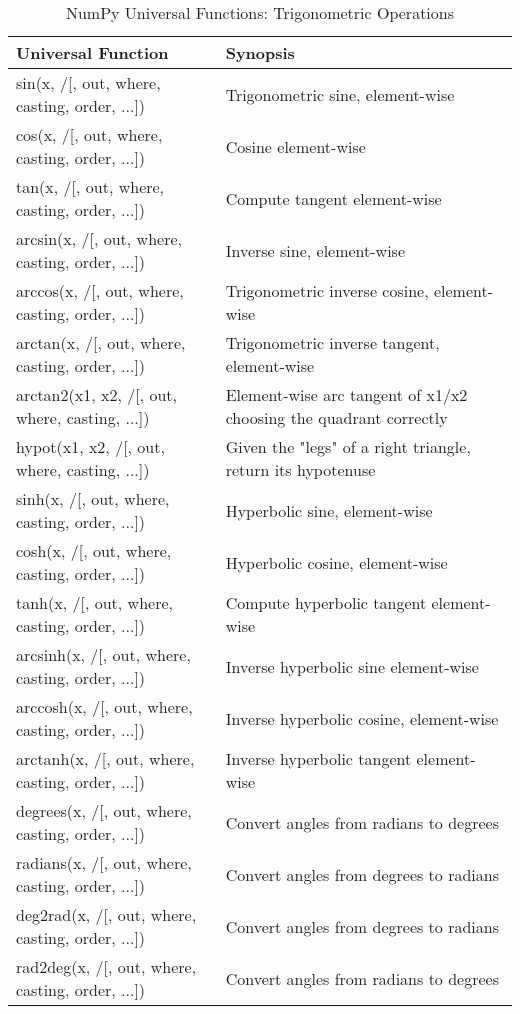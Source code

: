 \documentclass[a4paper,11pt]{book}
\numberwithin{figure}{chapter}
\numberwithin{table}{chapter}
\begin{document}
\begin{appendices}
\begin{table}
\caption{NumPy Universal Functions: Trigonometric Operations}
\centering
\begin{tabular}{lp{8.5cm}}
\toprule \toprule 
Universal Function & Synopsis \\
\midrule
sin(x, /[, out, where, casting, order, ...])
& Trigonometric sine, element-wise\\
cos(x, /[, out, where, casting, order, ...])
& Cosine element-wise\\
tan(x, /[, out, where, casting, order, ...])
& Compute tangent element-wise\\
arcsin(x, /[, out, where, casting, order, ...])
& Inverse sine, element-wise\\
arccos(x, /[, out, where, casting, order, ...])
& Trigonometric inverse cosine, element-wise\\
arctan(x, /[, out, where, casting, order, ...])
& Trigonometric inverse tangent, element-wise\\
arctan2(x1, x2, /[, out, where, casting, ...])
& Element-wise arc tangent of x1/x2 choosing the quadrant correctly\\
hypot(x1, x2, /[, out, where, casting, ...])
& Given the "legs" of a right triangle, return its hypotenuse\\
sinh(x, /[, out, where, casting, order, ...])
& Hyperbolic sine, element-wise\\
cosh(x, /[, out, where, casting, order, ...])
& Hyperbolic cosine, element-wise\\
tanh(x, /[, out, where, casting, order, ...])
& Compute hyperbolic tangent element-wise\\
arcsinh(x, /[, out, where, casting, order, ...])
& Inverse hyperbolic sine element-wise\\
arccosh(x, /[, out, where, casting, order, ...])
& Inverse hyperbolic cosine, element-wise\\
arctanh(x, /[, out, where, casting, order, ...])
& Inverse hyperbolic tangent element-wise\\
degrees(x, /[, out, where, casting, order, ...])
& Convert angles from radians to degrees\\
radians(x, /[, out, where, casting, order, ...])
& Convert angles from degrees to radians\\
deg2rad(x, /[, out, where, casting, order, ...])
& Convert angles from degrees to radians\\
rad2deg(x, /[, out, where, casting, order, ...])
& Convert angles from radians to degrees\\
\bottomrule
\end{tabular}
\end{table}
\clearpage


\end{appendices}
\end{document}
